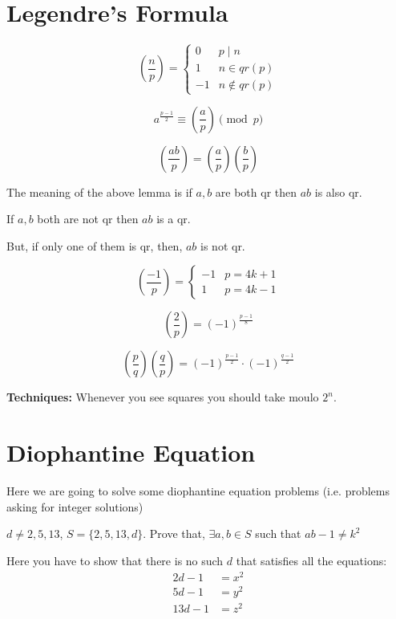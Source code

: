 \section{Legendre's Formula}
\begin{definition}
\[\left(\frac{n}{p}\right)=\begin{cases}
				0 & p\mid n \\
				1 & n\in qr(p) \\
				-1 & n\not\in qr(p)
				\end{cases}
				\]
\end{definition}

\begin{theorem}
\[a^{\frac{p-1}{2}}\equiv \left(\frac{a}{p}\right) \pmod p \]
\end{theorem}


\begin{lemma}
\[\left(\frac{ab}{p}\right)=\left(\frac{a}{p}\right)\left(\frac{b}{p}\right)\]
\end{lemma}
The meaning of the above lemma is if $a,b$ are both qr then $ab$ is also qr.

If $a,b$ both are not qr then $ab$ is a qr.

But, if only one of them is qr, then, $ab$ is not qr.

\begin{lemma}
\[\left(\frac{-1}{p}\right)=\begin{cases}
			-1 & p=4k+1 \\
			1 & p=4k-1
			\end{cases}
			\]
\end{lemma}

\begin{lemma}
\[\left(\frac{2}{p}\right)=(-1)^{\frac{p-1}{8}}\]
\end{lemma}


\begin{lemma}
\[\left(\frac{p}{q}\right)\left(\frac{q}{p}\right)=(-1)^{\frac{p-1}{2}}\cdot (-1)^{\frac{q-1}{2}}\]
\end{lemma}
\textbf{Techniques:}
Whenever you see squares you should take moulo $2^n$.

\section{Diophantine Equation}
Here we are going to solve some diophantine equation problems (i.e. problems asking for integer solutions)
\begin{example}
$d\neq 2,5,13$, $S=\{2,5,13,d\}$. Prove that, $\exists a,b \in S$ such that $ab-1 \neq k^2$
\end{example}
Here you have to show that there is no such $d$ that satisfies all the equations:
\begin{align*}
2d-1 &=x^2 \\
5d-1 &=y^2 \\
13d-1 &=z^2 
\end{align*}

